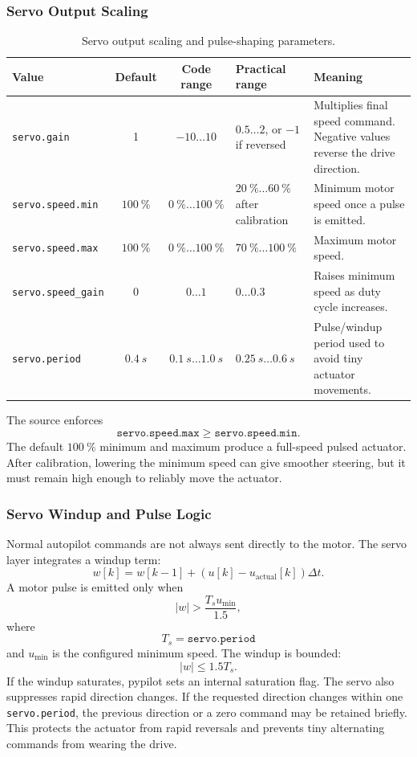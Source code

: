\documentclass[10pt,twocolumn]{article}
\newcommand{\abs}[1]{\left\lvert #1 \right\rvert}
\begin{document}
\subsubsection{Servo Output Scaling}
\begin{table}[!tbp]
\centering
\caption{Servo output scaling and pulse-shaping parameters.}
\label{tab:pypilot-servo-scaling}
\begin{tabularx}{\textwidth}{Z{0.23\textwidth}c c Z{0.16\textwidth}Y}
\toprule
Value & Default & Code range & Practical range & Meaning \\
\midrule
\texttt{servo.gain} &
\num{1} &
\(\num{-10}\ldots\num{10}\) &
\(\num{0.5}\ldots\num{2}\), or \(-1\) if reversed &
Multiplies final speed command.  Negative values reverse the drive direction. \\
\texttt{servo.speed.min} &
\(\SI{100}{\percent}\) &
\(\SI{0}{\percent}\ldots\SI{100}{\percent}\) &
\(\SI{20}{\percent}\ldots\SI{60}{\percent}\) after calibration &
Minimum motor speed once a pulse is emitted. \\
\texttt{servo.speed.max} &
\(\SI{100}{\percent}\) &
\(\SI{0}{\percent}\ldots\SI{100}{\percent}\) &
\(\SI{70}{\percent}\ldots\SI{100}{\percent}\) &
Maximum motor speed. \\
\texttt{servo.speed\_gain} &
\num{0} &
\(\num{0}\ldots\num{1}\) &
\(\num{0}\ldots\num{0.3}\) &
Raises minimum speed as duty cycle increases. \\
\texttt{servo.period} &
\(\SI{0.4}{s}\) &
\(\SI{0.1}{s}\ldots\SI{1.0}{s}\) &
\(\SI{0.25}{s}\ldots\SI{0.6}{s}\) &
Pulse/windup period used to avoid tiny actuator movements. \\
\bottomrule
\end{tabularx}
\end{table}
The source enforces
\[
\texttt{servo.speed.max}
\ge
\texttt{servo.speed.min}.
\]
The default \(\SI{100}{\percent}\) minimum and maximum produce a
full-speed pulsed actuator.  After calibration, lowering the minimum speed
can give smoother steering, but it must remain high enough to reliably
move the actuator.
\subsubsection{Servo Windup and Pulse Logic}
Normal autopilot commands are not always sent directly to the motor.  The
servo layer integrates a windup term:
\[
w[k]
=
w[k-1]
+
\left(u[k]-u_{\mathrm{actual}}[k]\right)\Delta t .
\]
A motor pulse is emitted only when
\[
\abs{w}
>
\frac{T_s u_{\min}}{1.5},
\]
where
\[
T_s = \texttt{servo.period}
\]
and \(u_{\min}\) is the configured minimum speed.  The windup is bounded:
\[
\abs{w}
\le
1.5T_s .
\]
If the windup saturates, pypilot sets an internal saturation flag.
The servo also suppresses rapid direction changes.  If the requested
direction changes within one \texttt{servo.period}, the previous direction
or a zero command may be retained briefly.  This protects the actuator
from rapid reversals and prevents tiny alternating commands from wearing
the drive.
\end{document}
